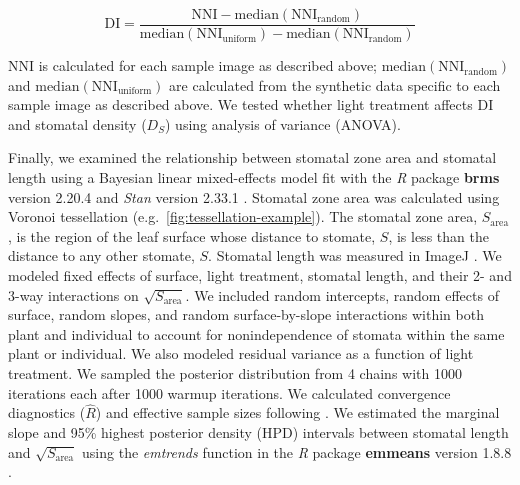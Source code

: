 \documentclass[webpdf,large,modern,unnumsec,namedate]{oup-authoring-template}
\begin{document}
\begin{equation}\label{eq:disp}
  \mathrm{DI} = \frac{\mathrm{NNI} - \text{median}(\mathrm{NNI_{random}})}{\text{median}(\mathrm{NNI_{uniform}}) - \text{median}(\mathrm{NNI_{random}})}
\end{equation}

\noindent \(\mathrm{NNI}\) is calculated for each sample image as
described above; \(\text{median}(\mathrm{NNI_{random}})\) and
\(\text{median}(\mathrm{NNI_{uniform}})\) are calculated from the
synthetic data specific to each sample image as described above. We
tested whether light treatment affects \(\mathrm{DI}\) and stomatal
density (\(D_S\)) using analysis of variance (ANOVA).

Finally, we examined the relationship between stomatal zone area and
stomatal length using a Bayesian linear mixed-effects model fit with the
\emph{R} package \textbf{brms} version 2.20.4
\citep{burkner_brms_2017, burkner_advanced_2018} and \emph{Stan} version
2.33.1 \citep{stan_development_team_stan_2023}. Stomatal zone area was
calculated using Voronoi tessellation
(e.g.~\autoref{fig:tessellation-example}). The stomatal zone area,
\(S_\text{area}\), is the region of the leaf surface whose distance to
stomate, \(S\), is less than the distance to any other stomate, \(S\).
Stomatal length was measured in ImageJ \citep{schneider_nih_2012}. We
modeled fixed effects of surface, light treatment, stomatal length, and
their 2- and 3-way interactions on \(\sqrt{S_\text{area}}\). We included
random intercepts, random effects of surface, random slopes, and random
surface-by-slope interactions within both plant and individual to
account for nonindependence of stomata within the same plant or
individual. We also modeled residual variance as a function of light
treatment. We sampled the posterior distribution from 4 chains with 1000
iterations each after 1000 warmup iterations. We calculated convergence
diagnostics (\(\hat{R}\)) and effective sample sizes following
\citet{vehtari_rank-normalization_2021}. We estimated the marginal slope
and 95\% highest posterior density (HPD) intervals between stomatal
length and \(\sqrt{S_\text{area}}\) using the \emph{emtrends} function
in the \emph{R} package \textbf{emmeans} version 1.8.8
\citep{lenth_emmeans_2023}.
\end{document}
